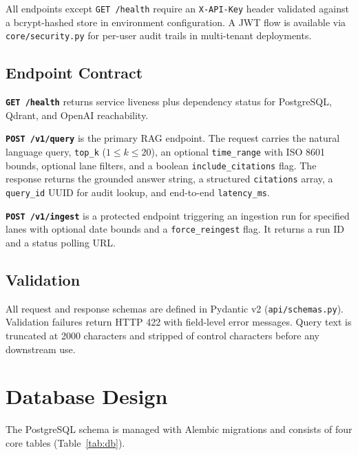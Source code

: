 \documentclass[10pt,a4paper,twocolumn]{article}
\begin{document}
All endpoints except \texttt{GET /health} require an \texttt{X-API-Key} header validated
against a bcrypt-hashed store in environment configuration. A JWT flow is available via
\texttt{core/security.py} for per-user audit trails in multi-tenant deployments.

\subsection{Endpoint Contract}

\textbf{\texttt{GET /health}} returns service liveness plus dependency status for PostgreSQL,
Qdrant, and OpenAI reachability.

\textbf{\texttt{POST /v1/query}} is the primary RAG endpoint. The request carries the natural
language query, \texttt{top\_k} ($1 \leq k \leq 20$), an optional \texttt{time\_range}
with ISO 8601 bounds, optional lane filters, and a boolean \texttt{include\_citations} flag.
The response returns the grounded answer string, a structured \texttt{citations} array, a
\texttt{query\_id} UUID for audit lookup, and end-to-end \texttt{latency\_ms}.

\textbf{\texttt{POST /v1/ingest}} is a protected endpoint triggering an ingestion run for
specified lanes with optional date bounds and a \texttt{force\_reingest} flag. It returns
a run ID and a status polling URL.

\subsection{Validation}

All request and response schemas are defined in Pydantic v2 (\texttt{api/schemas.py}).
Validation failures return HTTP 422 with field-level error messages. Query text is
truncated at 2000 characters and stripped of control characters before any downstream use.

\section{Database Design}

The PostgreSQL schema is managed with Alembic migrations and consists of four core tables
(Table~\ref{tab:db}).
\end{document}
